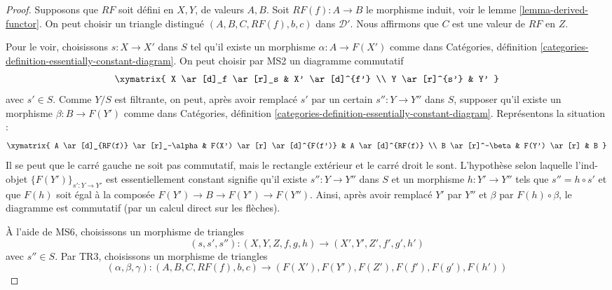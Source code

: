 \begin{proof}
Supposons que $RF$ soit défini en $X, Y$, de valeurs $A, B$. Soit
$RF(f) : A \to B$ le morphisme induit, voir le
lemme \ref{lemma-derived-functor}. On peut choisir un triangle distingué
$(A, B, C, RF(f), b, c)$ dans $\mathcal{D}'$. Nous affirmons que $C$ est une
valeur de $RF$ en $Z$.

\medskip\noindent
Pour le voir, choisissons $s : X \to X'$ dans $S$ tel qu'il existe un
morphisme $\alpha : A \to F(X')$ comme dans Catégories, définition
\ref{categories-definition-essentially-constant-diagram}. On peut choisir par
MS2 un diagramme commutatif
$$
\xymatrix{
X \ar[d]_f \ar[r]_s & X' \ar[d]^{f'} \\
Y \ar[r]^{s'} & Y'
}
$$
avec $s' \in S$. Comme $Y/S$ est filtrante, on peut, après avoir remplacé
$s'$ par un certain $s'' : Y \to Y''$ dans $S$, supposer qu'il existe un
morphisme $\beta : B \to F(Y')$ comme dans Catégories, définition
\ref{categories-definition-essentially-constant-diagram}. Représentons la
situation :
$$
\xymatrix{
A \ar[d]_{RF(f)} \ar[r]_-\alpha &
F(X') \ar[r] \ar[d]^{F(f')} &
A \ar[d]^{RF(f)} \\
B \ar[r]^-\beta & F(Y') \ar[r] & B
}
$$
Il se peut que le carré gauche ne soit pas commutatif, mais le rectangle
extérieur et le carré droit le sont. L'hypothèse selon laquelle l'ind-objet
$\{F(Y')\}_{s' : Y \to Y'}$ est essentiellement constant signifie qu'il
existe $s'' : Y \to Y''$ dans $S$ et un morphisme $h : Y' \to Y''$ tels que
$s'' = h \circ s'$ et que $F(h)$ soit égal à la composée
$F(Y') \to B \to F(Y') \to F(Y'')$. Ainsi, après avoir remplacé $Y'$ par
$Y''$ et $\beta$ par $F(h) \circ \beta$, le diagramme est commutatif (par un
calcul direct sur les flèches).

\medskip\noindent
À l'aide de MS6, choisissons un morphisme de triangles
$$
(s, s', s'') : (X, Y, Z, f, g, h) \longrightarrow
(X', Y', Z', f', g', h')
$$
avec $s'' \in S$. Par TR3, choisissons un morphisme de triangles
$$
(\alpha, \beta, \gamma) :
(A, B, C, RF(f), b, c)
\longrightarrow
(F(X'), F(Y'), F(Z'), F(f'), F(g'), F(h'))
$$


\end{proof}
